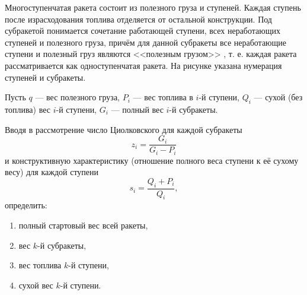 Многоступенчатая ракета состоит из полезного груза и ступеней.
Каждая ступень после израсходования топлива отделяется от остальной конструкции.
Под субракетой понимается сочетание работающей ступени,
всех неработающих ступеней и полезного груза,
причём для данной субракеты все неработающие ступени и полезный груз
являются <<полезным грузом>> , т. е. каждая ракета
рассматривается как одноступенчатая ракета.
На рисунке указана нумерация ступеней и субракеты.

Пусть $q$ --- вес полезного груза, $P_i$ --- вес топлива в $i$-й ступени,
$Q_i$ --- сухой (без топлива) вес $i$-й ступени,
$G_i$ --- полный вес $i$-й субракеты.

Вводя в рассмотрение число Циолковского для каждой субракеты
$$z_i = \frac{G_i}{G_i - P_i}$$
и конструктивную характеристику
(отношение полного веса ступени к её сухому весу)
для каждой ступени
$$s_i = \frac{Q_i + P_i}{Q_i},$$
определить:
\begin{enumerate}
\item полный стартовый вес всей ракеты,
\item вес $k$-й субракеты,
\item вес топлива $k$-й ступени,
\item сухой вес $k$-й ступени.
\end{enumerate}
